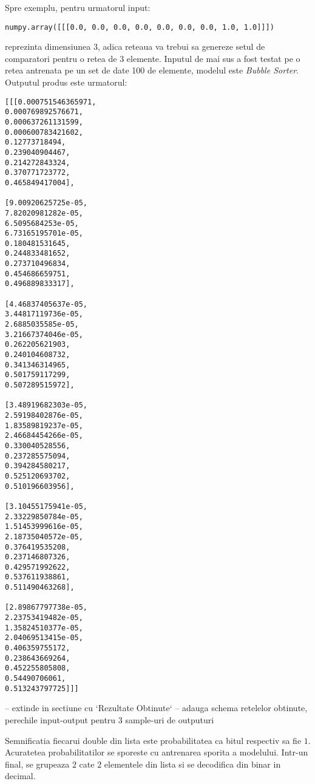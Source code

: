 \documentclass[12pt]{article}
\begin{document}
Spre exemplu, pentru urmatorul input:

\begin{center}
\begin{lstlisting}
numpy.array([[[0.0, 0.0, 0.0, 0.0, 0.0, 0.0, 0.0, 1.0, 1.0]]])
\end{lstlisting}
\end{center}

reprezinta dimensiunea 3, adica reteaua va trebui sa genereze setul de comparatori pentru o retea de 3 elemente. Inputul de mai sus a fost testat pe o retea antrenata pe un set de date 100 de elemente, modelul este \textit{Bubble Sorter}. Outputul produs este urmatorul:
\begin{center}
\begin{multicols}{2}
\begin{lstlisting}
[[[0.000751546365971,
0.000769892576671,
0.000637261131599,
0.000600783421602,
0.12773718494,
0.239040904467,
0.214272843324,
0.370771723772,
0.465849417004],

[9.00920625725e-05,
7.82020981282e-05,
6.5095684253e-05,
6.73165195701e-05,
0.180481531645,
0.244833481652,
0.273710496834,
0.454686659751,
0.496889833317],

[4.46837405637e-05,
3.44817119736e-05,
2.6885035585e-05,
3.21667374046e-05,
0.262205621903,
0.240104608732,
0.341346314965,
0.501759117299,
0.507289515972],

[3.48919682303e-05,
2.59198402876e-05,
1.83589819237e-05,
2.46684454266e-05,
0.330040528556,
0.237285575094,
0.394284580217,
0.525120693702,
0.510196603956],

[3.10455175941e-05,
2.33229850784e-05,
1.51453999616e-05,
2.18735040572e-05,
0.376419535208,
0.237146807326,
0.429571992622,
0.537611938861,
0.511490463268],

[2.89867797738e-05,
2.23753419482e-05,
1.35824510377e-05,
2.04069513415e-05,
0.406359755172,
0.238643669264,
0.452255805808,
0.54490706061,
0.513243797725]]]
\end{lstlisting}
\end{multicols}
\end{center}

-- extinde in sectiune cu `Rezultate Obtinute`
-- adauga schema retelelor obtinute, perechile input-output pentru 3 sample-uri de outputuri
 
Semnificatia fiecarui double din lista este probabilitatea ca bitul respectiv sa fie $1$. Acuratetea probabilitatilor se sporeste cu antrenarea sporita a modelului. Intr-un final, se grupeaza $2$ cate $2$ elementele din lista si se decodifica din binar in decimal.
\end{document}
